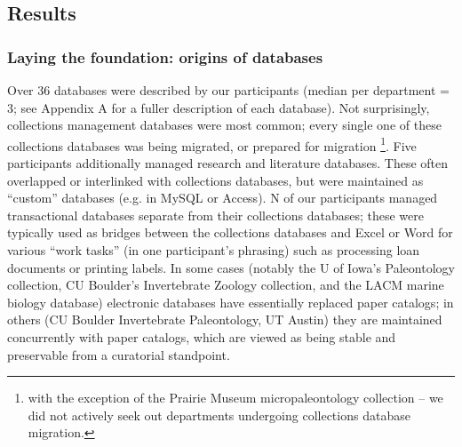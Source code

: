 \subsection{Results}
\subsubsection{Laying the foundation: origins of databases}

Over 36 databases were described by our participants (median per department = 3; see Appendix A for a fuller description of each database). Not surprisingly, collections management databases were most common; every single one of these collections databases was being migrated, or prepared for migration \footnote{with the exception of the Prairie Museum micropaleontology collection – we did not actively seek out departments undergoing collections database migration.}. Five participants additionally managed research and literature databases. These often overlapped or interlinked with collections databases, but were maintained as “custom” databases (e.g. in MySQL or Access). N of our participants managed transactional databases separate from their collections databases; these were typically used as bridges between the collections databases and Excel or Word for various “work tasks” (in one participant’s phrasing) such as processing loan documents or printing labels.  In some cases (notably the U of Iowa’s Paleontology collection, CU Boulder’s Invertebrate Zoology collection, and the LACM marine biology database) electronic databases have essentially replaced paper catalogs; in others (CU Boulder Invertebrate Paleontology, UT Austin) they are maintained concurrently with paper catalogs, which are viewed as being stable and preservable from a curatorial standpoint.

